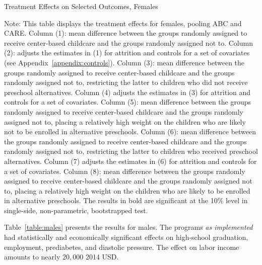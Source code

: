 \begin{table}[H] 
\begin{threeparttable}
\caption{Treatment Effects on Selected Outcomes, Females}
\label{table:females}
\centering
\scalebox{.97}{
}
\begin{tablenotes}
\footnotesize
\item Note: This table displays the treatment effects for females, pooling ABC and CARE. Column (1): mean difference between the groups randomly assigned to receive center-based childcare and the groups randomly assigned not to. Column (2): adjusts the estimates in (1) for attrition and controls for a set of covariates (see Appendix~\ref{appendix:controls}). Column (3): mean difference between the groups randomly assigned to receive center-based childcare and the groups randomly assigned not to, restricting the latter to children who did not receive preschool alternatives. Column (4) adjusts the estimates in (3) for attrition and controls for a set of covariates. Column (5): mean difference between the groups randomly assigned to receive center-based childcare and the groups randomly assigned not to, placing a relatively high weight on the children who are likely not to be enrolled in alternative preschools. Column (6): mean difference between the groups randomly assigned to receive center-based childcare and the groups randomly assigned not to, restricting the latter to children who received preschool alternatives. Column (7) adjusts the estimates in (6) for attrition and controls for a set of covariates. Column (8): mean difference between the groups randomly assigned to receive center-based childcare and the groups randomly assigned not to, placing a relatively high weight on the children who are likely to be enrolled in alternative preschools. The results in bold are significant at the 10\% level in single-side, non-parametric, bootstrapped test.
\end{tablenotes}
\end{threeparttable}
\end{table}

\noindent Table~\ref{table:males} presents the results for males. The programs \textit{as implemented} had statistically and economically significant effects on high-school graduation, employment, prediabetes, and diastolic pressure. The effect on labor income amounts to nearly $20,000$ 2014 USD.\\


